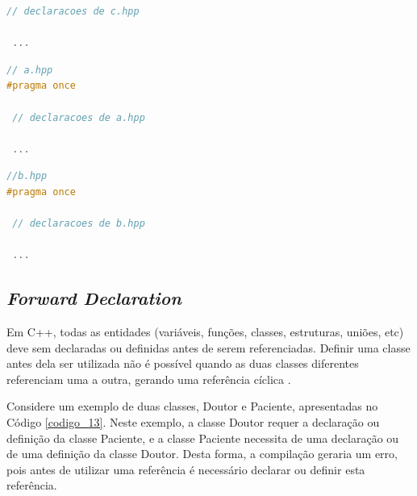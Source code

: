 \begin{enumerate}
\begin{lstlisting}[language=C++,caption={
                Arquivo c.hpp com guarda de inclusão \texttt{\#pragma once}},
                                                            label=codigo_10]
 // declaracoes de c.hpp

 ...

\end{lstlisting}

\begin{lstlisting}[language=C++,caption={
               Arquivo a.hpp com guarda de inclusão \texttt{\#pragma once}},
                                                            label=codigo_11]
// a.hpp
#pragma once 

 // declaracoes de a.hpp

 ...

\end{lstlisting}

\begin{lstlisting}[language=C++,caption={ 
              Arquivo b.hpp com guarda de inclusão \texttt{ \#pragma once}},
                                                            label=codigo_12]
//b.hpp
#pragma once 

 // declaracoes de b.hpp

 ...

\end{lstlisting}

\end{enumerate}

\subsection{\textit{Forward Declaration}}\label{forward_declaration_section}

Em C++, todas as entidades (variáveis, funções, classes, estruturas, uniões,
 etc) deve sem declaradas ou definidas antes de serem referenciadas. Definir
 uma classe antes dela ser utilizada não é possível quando as duas classes
 diferentes referenciam uma a outra, gerando uma referência cíclica
\cite{ref43}.

Considere um exemplo de duas classes, Doutor e Paciente, apresentadas no 
Código \ref{codigo_13}. Neste exemplo, a classe Doutor requer a 
declaração ou definição da classe Paciente, e a classe Paciente necessita 
de uma declaração ou de uma definição da classe Doutor. Desta forma, a 
compilação geraria um erro, pois antes de utilizar uma referência é 
necessário declarar ou definir esta referência.

